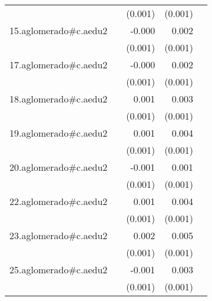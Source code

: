 {\begin{longtable}{l*{4}{D{.}{.}{-1}}}
            &                     &     (0.001)         &     (0.001)         &                     \\
\addlinespace
15.aglomerado#c.aedu2&                     &      -0.000         &       0.002\sym{**} &                     \\
            &                     &     (0.001)         &     (0.001)         &                     \\
\addlinespace
17.aglomerado#c.aedu2&                     &      -0.000         &       0.002\sym{*}  &                     \\
            &                     &     (0.001)         &     (0.001)         &                     \\
\addlinespace
18.aglomerado#c.aedu2&                     &       0.001         &       0.003\sym{***}&                     \\
            &                     &     (0.001)         &     (0.001)         &                     \\
\addlinespace
19.aglomerado#c.aedu2&                     &       0.001         &       0.004\sym{***}&                     \\
            &                     &     (0.001)         &     (0.001)         &                     \\
\addlinespace
20.aglomerado#c.aedu2&                     &      -0.001         &       0.001         &                     \\
            &                     &     (0.001)         &     (0.001)         &                     \\
\addlinespace
22.aglomerado#c.aedu2&                     &       0.001         &       0.004\sym{***}&                     \\
            &                     &     (0.001)         &     (0.001)         &                     \\
\addlinespace
23.aglomerado#c.aedu2&                     &       0.002\sym{*}  &       0.005\sym{***}&                     \\
            &                     &     (0.001)         &     (0.001)         &                     \\
\addlinespace
25.aglomerado#c.aedu2&                     &      -0.001         &       0.003\sym{**} &                     \\
            &                     &     (0.001)         &     (0.001)         &                     \\

\end{longtable}}
